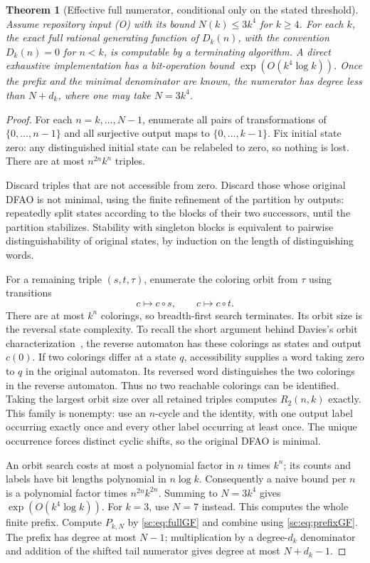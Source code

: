 \documentclass[11pt,a4paper]{article}
\numberwithin{equation}{section}
\newtheorem{theorem}{Theorem}[section]
\theoremstyle{definition}
\theoremstyle{remark}
\begin{document}
\begin{theorem}[Effective full numerator, conditional only on the stated threshold]\label{sc:thm:prefix}
Assume repository input (O) with its bound $N(k)\le3k^4$ for $k\ge4$.
For each $k$, the exact full rational generating function of $D_k(n)$,
with the convention $D_k(n)=0$ for $n<k$, is computable by a terminating
algorithm. A direct exhaustive implementation has a bit-operation bound
$\exp(O(k^4\log k))$. Once the prefix and the minimal denominator are
known, the numerator has degree less than $N+d_k$, where one may take
$N=3k^4$.
\end{theorem}
\begin{proof}
For each $n=k,\ldots,N-1$, enumerate all pairs of transformations of
$\{0,\ldots,n-1\}$ and all surjective output maps to
$\{0,\ldots,k-1\}$. Fix initial state zero: any distinguished initial
state can be relabeled to zero, so nothing is lost. There are at most
$n^{2n}k^n$ triples.

Discard triples that are not accessible from zero. Discard those whose
original DFAO is not minimal, using the finite refinement of the partition
by outputs: repeatedly split states according to the blocks of their two
successors, until the partition stabilizes. Stability with singleton
blocks is equivalent to pairwise distinguishability of original states,
by induction on the length of distinguishing words.

For a remaining triple $(s,t,\tau)$, enumerate the coloring orbit from
$\tau$ using transitions
\[
 c\longmapsto c\circ s,\qquad c\longmapsto c\circ t.
\]
There are at most $k^n$ colorings, so breadth-first search terminates.
Its orbit size is the reversal state complexity. To recall the short
argument behind Davies's orbit characterization~\cite{Davies2017}, the reverse
automaton has these colorings as states and output $c(0)$. If two
colorings differ at a state $q$, accessibility supplies a word taking
zero to $q$ in the original automaton. Its reversed word distinguishes
the two colorings in the reverse automaton. Thus no two reachable
colorings can be identified. Taking the largest orbit size over all
retained triples computes $R_2(n,k)$ exactly. This family is nonempty:
use an $n$-cycle and the identity, with one output label occurring exactly
once and every other label occurring at least once. The unique occurrence
forces distinct cyclic shifts, so the original DFAO is minimal.

An orbit search costs at most a polynomial factor in $n$ times $k^n$;
its counts and labels have bit lengths polynomial in $n\log k$.
Consequently a naive bound per $n$ is a polynomial factor times
$n^{2n}k^{2n}$. Summing to $N=3k^4$ gives
$\exp(O(k^4\log k))$. For $k=3$, use $N=7$ instead. This computes the
whole finite prefix. Compute $P_{k,N}$ by \eqref{sc:eq:fullGF} and combine
using \eqref{sc:eq:prefixGF}. The prefix has degree at most $N-1$;
multiplication by a degree-$d_k$ denominator and addition of the shifted
tail numerator gives degree at most $N+d_k-1$.
\end{proof}
\end{document}
